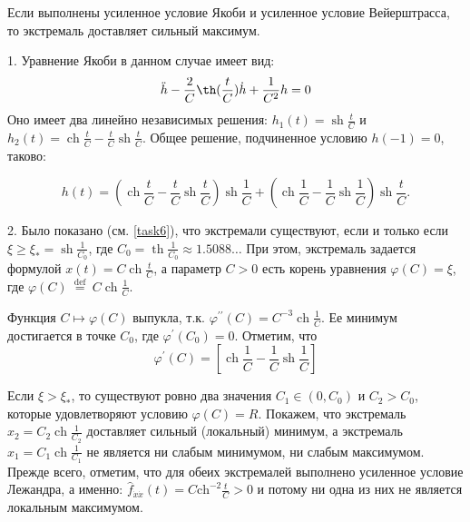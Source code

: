 \begin{task}
    \begin{theorem}
        Если выполнены усиленное 
        условие Якоби и усиленное условие Вейерштрасса, то экстремаль доставляет
        сильный максимум.
    \end{theorem}




1. Уравнение Якоби в данном случае имеет вид:
\begin{equation*}
    \ddot{h}-\frac{2}{C} \th (\frac{t}{C}) \dot{h}+\frac{1}{C^2} h = 0    
\end{equation*}
Оно имеет два линейно независимых решения: 
$h_1(t)=\operatorname{sh} \frac{t}{C}$ и $h_2(t)=\operatorname{ch} \frac{t}{C}-\frac{t}{C} \operatorname{sh} \frac{t}{C}$. 
Общее решение, подчиненное условию $h(-1)=0$, таково:

\begin{equation*}
h(t)=\left(\operatorname{ch} \frac{t}{C}-\frac{t}{C} \operatorname{sh} \frac{t}{C}\right) \operatorname{sh} \frac{1}{C}+\left(\operatorname{ch} \frac{1}{C}-\frac{1}{C} \operatorname{sh} \frac{1}{C}\right) \operatorname{sh} \frac{t}{C} .
\end{equation*}

2. Было показано (см. \ref{task6}), что экстремали существуют, 
если и только если $\xi \geq \xi_{*}=\operatorname{sh} \frac{1}{C_0}$, 
где $C_0=\operatorname{th} \frac{1}{C_0} \approx 1.5088 \ldots$ При этом, экстремаль задается формулой 
$x(t)=C \operatorname{ch} \frac{t}{C}$, а параметр $C>0$ есть корень уравнения $\varphi(C) = \xi$, 
где $\varphi(C) \stackrel{\text { def }}{=} C \operatorname{ch} \frac{1}{C}$. 

Функция $C \mapsto \varphi(C)$ выпукла, т.к. $\varphi^{\prime \prime}(C)=C^{-3} \operatorname{ch} \frac{1}{C}$. 
Ее минимум достигается в точке $C_0$, где $\varphi^{\prime}\left(C_0\right)=0$. Отметим, что
$$
\varphi^{\prime}(C)=\left[\operatorname{ch} \frac{1}{C}-\frac{1}{C} \operatorname{sh} \frac{1}{C}\right]
$$

Если $\xi > \xi_{*}$, то существуют ровно два значения $C_1 \in\left(0, C_0\right)$ и $C_2>C_0$, 
которые удовлетворяют условию $\varphi(C)=R$. Покажем, что экстремаль $\widehat{x}_2=C_2 \operatorname{ch} \frac{1}{C_2}$ 
доставляет сильный (локальный) минимум, а экстремаль $\widehat{x}_1=C_1 \operatorname{ch} \frac{1}{C_1}$ 
не является ни слабым минимумом, ни слабым максимумом. Прежде всего, отметим, что для обеих экстремалей выполнено 
усиленное условие Лежандра, а именно: $\widehat{f}_{\dot{x} \dot{x}}(t)=C \mathrm{ch}^{-2} \frac{t}{C} > 0$ 
и потому ни одна из них не является локальным максимумом. \par



\end{task}
